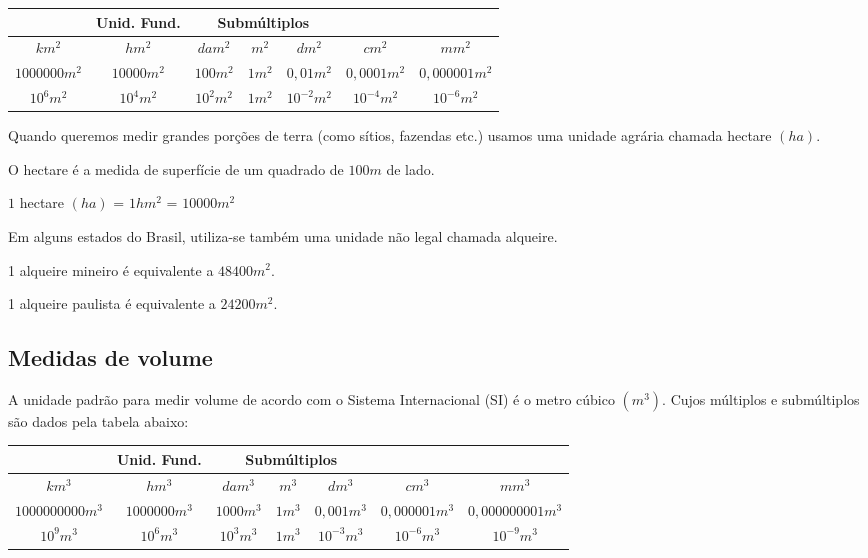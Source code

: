  \begin{table}[H]
 \centering
 \begin{tabular}{|c|c|c|c|c|c|c|} \hline
 \rowcolor{cinza}
  \multicolumn{3}{|c|}{\textbf{Múltiplos}}
 & \multicolumn{1}{|c|}{\textbf{Unid. Fund.}} & \multicolumn{3}{|c|}{\textbf{Submúltiplos}} \\
 \hline
 $km^2$ & $hm^2$ & $dam^2$ & $m^2$ & $dm^2$ & $cm^2$ & $mm^2$ \\
 \hline
 $1000 000 m^2$ & $10 000 m^2$ & $100 m^2$ & $1 m^2$ & $0,01 m^2$ & $0,0001 m^2$ & $0,000001 m^2$ \\ \hline
 $10^6 m^2$ & $10^4 m^2$ & $10^2 m^2$ & $1 m^2$ & $10^{-2} m^2$ & $10^{-4} m^2$ & $10^{-6} m^2$ \\ \hline
 \end{tabular}
 \end{table}

 Quando queremos medir grandes porções de terra (como sítios, fazendas etc.) usamos uma unidade agrária chamada hectare $(ha)$.

O hectare é a medida de superfície de um quadrado de $100 m$ de lado.

$1$ hectare $(ha)$ = $1 hm^2$ = $10 000 m^2$

Em alguns estados do Brasil, utiliza-se também uma unidade não legal chamada alqueire.

    1 alqueire mineiro é equivalente a $48 400 m^2$.

    1 alqueire paulista é equivalente a $24 200 m^2$.



\subsection{Medidas de volume}
A unidade padrão para medir volume de acordo com o Sistema Internacional (SI) é o metro cúbico $(m^3)$. Cujos múltiplos e submúltiplos são dados pela tabela abaixo:

 \begin{table}[H]
 \centering
 \begin{tabular}{|c|c|c|c|c|c|c|} \hline
 \rowcolor{cinza}
  \multicolumn{3}{|c|}{\textbf{Múltiplos}}
 & \multicolumn{1}{|c|}{\textbf{Unid. Fund.}} & \multicolumn{3}{|c|}{\textbf{Submúltiplos}} \\
 \hline
 $km^3$ & $hm^3$ & $dam^3$ & $m^3$ & $dm^3$ & $cm^3$ & $mm^3$ \\
 \hline
 $1000 000 000 m^3$ & $1000 000 m^3$ & $1000 m^3$ & $1 m^3$ & $0,001 m^3$ & $0,000001 m^3$ & $0,000000001 m^3$ \\ \hline
 $10^9 m^3$ & $10^6 m^3$ & $10^3 m^3$ & $1 m^3$ & $10^{-3} m^3$ & $10^{-6} m^3$ & $10^{-9} m^3$ \\ \hline
 \end{tabular}
\end{table}

